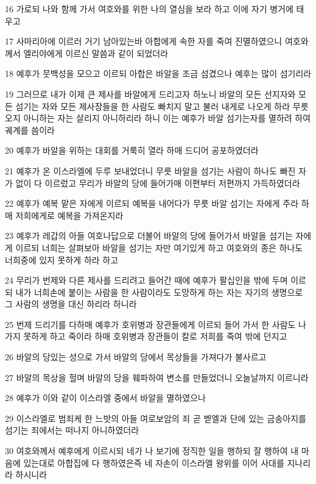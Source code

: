 \par 16 가로되 나와 함께 가서 여호와를 위한 나의 열심을 보라 하고 이에 자기 병거에 태우고
\par 17 사마리아에 이르러 거기 남아있는바 아합에게 속한 자를 죽여 진멸하였으니 여호와께서 엘리야에게 이르신 말씀과 같이 되었더라
\par 18 예후가 뭇백성을 모으고 이르되 아합은 바알을 조금 섬겼으나 예후는 많이 섬기리라
\par 19 그러므로 내가 이제 큰 제사를 바알에게 드리고자 하노니 바알의 모든 선지자와 모든 섬기는 자와 모든 제사장들을 한 사람도 빠치지 말고 불러 내게로 나오게 하라 무릇 오지 아니하는 자는 살리지 아니하리라 하니 이는 예후가 바알 섬기는자를 멸하려 하여 궤계를 씀이라
\par 20 예후가 바알을 위하는 대회를 거룩히 열라 하매 드디어 공포하였더라
\par 21 예후가 온 이스라엘에 두루 보내었더니 무릇 바알을 섬기는 사람이 하나도 빠진 자가 없이 다 이르렀고 무리가 바알의 당에 들어가매 이편부터 저편까지 가득하였더라
\par 22 예후가 예복 맡은 자에게 이르되 예복을 내어다가 무릇 바알 섬기는 자에게 주라 하매 저희에게로 예복을 가져온지라
\par 23 예후가 레갑의 아들 여호나답으로 더불어 바알의 당에 들어가서 바알을 섬기는 자에게 이르되 너희는 살펴보아 바알을 섬기는 자만 여기있게 하고 여호와의 종은 하나도 너희중에 있지 못하게 하라 하고
\par 24 무리가 번제와 다른 제사를 드리려고 들어간 때에 예후가 팔십인을 밖에 두며 이르되 내가 너희손에 붙이는 사람을 한 사람이라도 도망하게 하는 자는 자기의 생명으로 그 사람의 생명을 대신 하리라 하니라
\par 25 번제 드리기를 다하매 예후가 호위병과 장관들에게 이르되 들어 가서 한 사람도 나가지 못하게 하고 죽이라 하매 호위병과 장관들이 칼로 저희를 죽여 밖에 던지고
\par 26 바알의 당있는 성으로 가서 바알의 당에서 목상들을 가져다가 불사르고
\par 27 바알의 목상을 헐며 바알의 당을 훼파하여 변소를 만들었더니 오늘날까지 이르니라
\par 28 예후가 이와 같이 이스라엘 중에서 바알을 멸하였으나
\par 29 이스라엘로 범죄케 한 느밧의 아들 여로보암의 죄 곧 벧엘과 단에 있는 금송아지를 섬기는 죄에서는 떠나지 아니하였더라
\par 30 여호와께서 예후에게 이르시되 네가 나 보기에 정직한 일을 행하되 잘 행하여 내 마음에 있는대로 아합집에 다 행하였은즉 네 자손이 이스라엘 왕위를 이어 사대를 지나리라 하시니라
